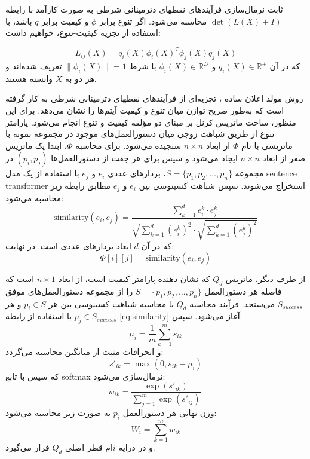 ثابت نرمال‌سازی فرآیندهای نقطه\/ای دترمینانی شرطی به صورت کارآمد با رابطه \( \det(L(X)+I) \) محاسبه می‌شود. اگر تنوع برابر \(\phi\) و کیفیت برابر $q$ باشد، با استفاده از تجزیه کیفیت-تنوع، خواهیم داشت:

\begin{equation}
	L_{ij} (X) = q_{i}(X) \phi_{i}(X)^{T} \phi_{j}(X)q_{j}(X) 
\end{equation} 
که در آن \( q_{i}(X) \in  \mathbb{R}^{+} \) و \( \phi_{i}(X) \in \mathbb{R}^{D} \) با شرط \( \|\phi_{i}(X)\|=1 \) تعریف شده‌اند و هر دو به \( X \) وابسته هستند.


روش مولد اعلان ساده ، تجزیه‌ای از فرآیندهای نقطه\/ای دترمینانی شرطی به کار گرفته است که به‌طور صریح توازن میان تنوع و کیفیت آیتم‌ها را نشان می‌دهد.
برای این منظور، ساخت ماتریس کرنل بر مبنای دو مؤلفه کیفیت و تنوع انجام می‌شود.
پارامتر تنوع از طریق شباهت زوجی میان دستورالعمل‌های موجود در مجموعه نمونه
 با ماتریسی با نام \( \Phi \) از ابعاد \( n \times n \) سنجیده می‌شود.
برای محاسبه \( \Phi \)، ابتدا یک ماتریس صفر از ابعاد \( n \times n \) ایجاد می‌شود و سپس برای هر جفت از دستورالعمل‌ها \( (p_i, p_j) \) در مجموعه \( S = \{p_1, p_2, \dots, p_n\} \)، بردار‌های عددی \( e_i \) و \( e_j \) با استفاده از یک مدل sentence transformer استخراج می‌شوند.
سپس شباهت کسینوسی بین \( e_i \) و \( e_j \) مطابق رابطه زیر محاسبه می‌شود:
\begin{equation}
	\label{eq:similarity}
	\text{similarity}(e_i, e_j) = \frac{\sum_{k=1}^{d} e_i^k \cdot e_j^k}{\sqrt{\sum_{k=1}^{d} (e_i^k)^2} \cdot \sqrt{\sum_{k=1}^{d} (e_j^k)^2}}
\end{equation}
که در آن \( d \) ابعاد بردارهای عددی است. 
در نهایت:
\begin{equation}
	\Phi[i][j] = \text{similarity}(e_i, e_j)
\end{equation}

\noindent از طرف دیگر، ماتریس
 \( Q_d \) 
 که نشان دهنده  پارامتر کیفیت است، از ابعاد \( n \times 1 \) است که فاصله هر دستورالعمل \( S = \{p_1, p_2, \dots, p_n\} \) را از مجموعه دستورالعمل‌های موفق \( S_{success} \) می‌سنجد.
فرآیند محاسبه \( Q_d \) با محاسبه شباهت کسینوسی بین هر \( p_i \in S \) و هر \( p_j \in S_{success} \) با استفاده از رابطه \ref{eq:similarity} آغاز می‌شود.
سپس:
\begin{equation}
	\mu_i = \frac{1}{m} \sum_{k=1}^{m} s_{ik}
\end{equation}
و انحرافات مثبت از میانگین محاسبه می‌گردد:
\begin{equation}
	s'_{ik} = \max(0, s_{ik} - \mu_i)
\end{equation}
که سپس با تابع softmax نرمال‌سازی می‌شود:
\begin{equation}
	w_{ik} = \frac{\exp(s'_{ik})}{\sum_{j=1}^{m} \exp(s'_{ij})}.
\end{equation}
وزن نهایی هر دستورالعمل \( p_i \) به صورت زیر محاسبه می‌شود:
\begin{equation}
	W_i = \sum_{k=1}^{m} w_{ik}
\end{equation}
و در درایه \( i \)ام قطر اصلی \( Q_d \) قرار می‌گیرد.

